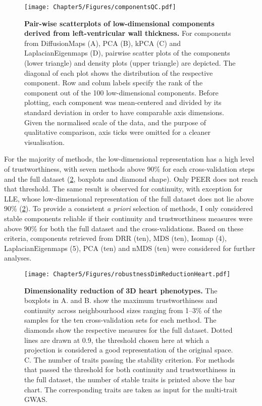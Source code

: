 \begin{figure}[h!]
	\centering
	\texttt{[image: Chapter5/Figures/componentsQC.pdf]}
	\caption[\textbf{Pair-wise scatterplots of low-dimensional components derived from left-ventricular wall thickness. }]{\textbf{Pair-wise scatterplots of low-dimensional components derived from left-ventricular wall thickness. }For components from DiffusionMaps (A), PCA (B), kPCA (C) and LaplacianEigenmaps (D),  pairwise scatter plots of the components (lower triangle) and density plots (upper triangle) are depicted. The diagonal of each plot shows the distribution of the respective component. Row and colum labels specify the rank of the component out of the \num{100} low-dimensional components. Before plotting, each component was mean-centered and divided by its standard deviation in order to have comparable axis dimensions. Given the normalised scale of the data, and the purpose of qualitative comparison, axis ticks were omitted for a cleaner visualisation. }
	 	\label{fig:distribution-DimRed}
\end{figure}

For the majority of methods, the low-dimensional representation has a high level of trustworthiness, with seven methods above \num{90}\% for each cross-validation steps and the full dataset (\cref{fig:dimRed-heart}, boxplots and diamond shape). Only PEER does not reach that threshold. The same result is observed for continuity, with exception for LLE, whose low-dimensional representation of the full dataset does not lie above \num{90}\% (\cref{fig:dimRed-heart}).  To provide a consistent \textit{a priori} selection of methods, I only considered stable components reliable if their continuity and trustworthiness measures were above \num{90}\% for both the full dataset and the cross-validations. Based on these criteria, components retrieved from DRR (ten), MDS (ten), Isomap (\num{4}), LaplacianEigenmaps (\num{5}), PCA (ten) and nMDS  (ten) were considered for further analyses.

\begin{figure}[h!]
	\centering
	\texttt{[image: Chapter5/Figures/robustnessDimReductionHeart.pdf]}
	\caption[\textbf{Dimensionality reduction of 3D heart phenotypes. }]{\textbf{Dimensionality reduction of 3D heart phenotypes. } The boxplots in A. and B. show the maximum trustworthiness and continuity across neighbourhood sizes ranging from \numrange{1}{3}\% of the samples for the ten cross-validation sets for each method. The diamonds show the respective measures for the full dataset. Dotted lines are drawn at \num{0.9}, the threshold chosen here at which a projection is considered a good representation of the original space. C. The number of traits passing the stability criterion. For methods that passed the threshold for both continuity and trustworthiness in the full dataset, the number of stable traits is printed above the bar chart. The corresponding traits are taken as input for the multi-trait GWAS.}
	 	\label{fig:dimRed-heart}
\end{figure}

